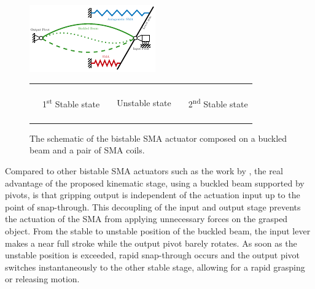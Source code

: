 \begin{figure}[hbt!] %
  \centering
   \includegraphics[width=0.8\columnwidth]{images/chap6/smabb-working-principle-schematic.pdf}
  \begin{tabular}{l@{ }l l@{ }l l@{ }l}
    {\color{mygreen} \rule[1.5pt]{10pt}{0.5mm} } & {\footnotesize 1\textsuperscript{st} Stable state} & {\color{mygreen} \rule[1.5pt]{1.5pt}{0.5mm} \rule[1.5pt]{1.5pt}{0.5mm} \rule[1.5pt]{1.5pt}{0.5mm}} & {\footnotesize Unstable state} &
    {\color{mygreen} \rule[1.5pt]{7.5pt}{0.5mm} \rule[1.5pt]{7.5pt}{0.5mm}} & {\footnotesize 2\textsuperscript{nd} Stable state}\\
  \end{tabular}
  \caption{The schematic of the bistable SMA actuator composed on a buckled beam and a pair of SMA coils.}
  \label{fig:smabbwp}
\end{figure}

Compared to other bistable SMA actuators such as the work by \cite{scholtesDevelopmentBistableSMA2021}, the real advantage of the proposed kinematic stage, using a buckled beam supported by pivots, is that gripping output is independent of the actuation input up to the point of snap-through. This decoupling of the input and output stage prevents the actuation of the SMA from applying unnecessary forces on the grasped object. From the stable to unstable position of the buckled beam, the input lever makes a near full stroke while the output pivot barely rotates. As soon as the unstable position is exceeded, rapid snap-through occurs and the output pivot switches instantaneously to the other stable stage, allowing for a rapid grasping or releasing motion.

